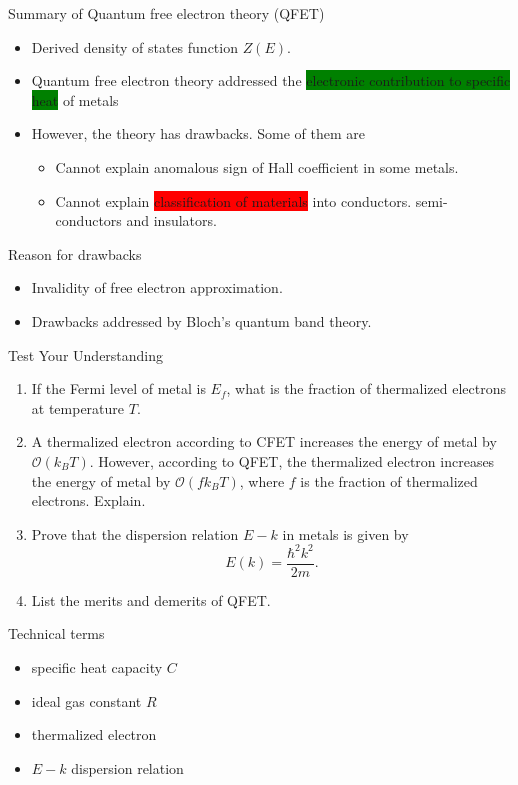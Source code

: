 %
\begin{frame}[label=pre-M2T1-slot1]{Summary of Quantum free electron theory (QFET)}
	\begin{itemize}
		\item Derived density of states function \(Z(E)\).
		\item Quantum free electron theory addressed the \colorbox{green}{electronic contribution to specific heat} of metals
		\item However, the theory has drawbacks. Some of them are
		\begin{itemize}
			\item Cannot explain anomalous sign of Hall coefficient in some metals.
			\item Cannot explain \colorbox{red}{classification of materials} into conductors. semi-conductors and insulators.
		\end{itemize} 
	\end{itemize}
	\begin{block}{Reason for drawbacks}
		\begin{itemize}
			\item Invalidity of free electron approximation.
			\item Drawbacks addressed by Bloch's quantum band theory.
		\end{itemize} 
	\end{block}
\end{frame}
%
%
\begin{frame}[label=pre-M2T1-slot1]{Test Your Understanding}
	\begin{enumerate}
		\item If the Fermi level of metal is \(E_f\), what is the fraction of thermalized electrons at temperature \(T\).
		\item A thermalized electron according to CFET increases the energy of metal by \(\mathcal{O}(k_B T)\).  However, according to QFET, the thermalized electron increases the energy of metal by \(\mathcal{O}(f k_B T)\), where \(f\) is the fraction of thermalized electrons. Explain.
		\item Prove that the dispersion relation \(E - k\) in metals is given by
		\[
		E(k) = \frac{\hbar^2 k^2}{2 m}.
		\]
		\item List the merits and demerits of QFET.
	\end{enumerate}
\end{frame}
%
\begin{frame}[label=pre-M2T1-slot1]{Technical terms}
	\begin{itemize}
		\item specific heat capacity \(C\)
		\item ideal gas constant \(R\)
		\item thermalized electron
		\item \(E - k\) dispersion relation
	\end{itemize}
\end{frame}
